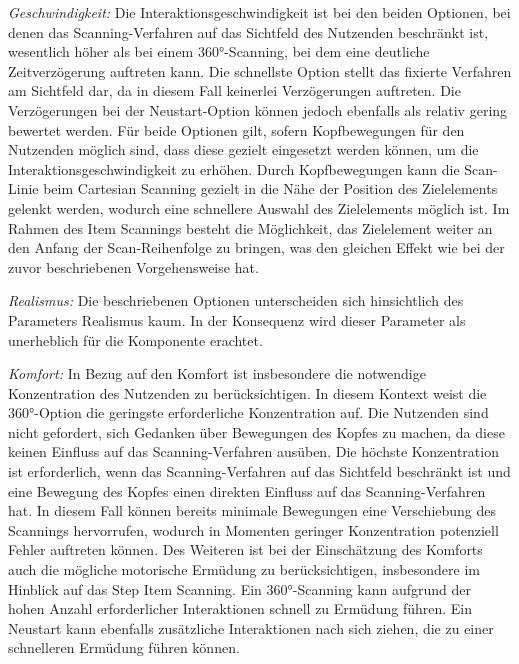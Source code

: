 \textit{Geschwindigkeit:}
Die Interaktionsgeschwindigkeit ist bei den beiden Optionen, bei denen das Scanning-Verfahren auf das Sichtfeld des Nutzenden beschränkt ist, wesentlich höher als bei einem 360°-Scanning, bei dem eine deutliche Zeitverzögerung auftreten kann.
Die schnellste Option stellt das fixierte Verfahren am Sichtfeld dar, da in diesem Fall keinerlei Verzögerungen auftreten. Die Verzögerungen bei der Neustart-Option können jedoch ebenfalls als relativ gering bewertet werden. Für beide Optionen gilt, sofern Kopfbewegungen für den Nutzenden möglich sind, dass diese gezielt eingesetzt werden können, um die Interaktionsgeschwindigkeit zu erhöhen. Durch Kopfbewegungen kann die Scan-Linie beim Cartesian Scanning gezielt in die Nähe der Position des Zielelements gelenkt werden, wodurch eine schnellere Auswahl des Zielelements möglich ist. Im Rahmen des Item Scannings besteht die Möglichkeit, das Zielelement weiter an den Anfang der Scan-Reihenfolge zu bringen, was den gleichen Effekt wie bei der zuvor beschriebenen Vorgehensweise hat.  

\textit{Realismus:}
Die beschriebenen Optionen unterscheiden sich hinsichtlich des Parameters Realismus kaum. In der Konsequenz wird dieser Parameter als unerheblich für die Komponente erachtet. 

\textit{Komfort:}
In Bezug auf den Komfort ist insbesondere die notwendige Konzentration des Nutzenden zu berücksichtigen. In diesem Kontext weist die 360°-Option die geringste erforderliche Konzentration auf. Die Nutzenden sind nicht gefordert, sich Gedanken über Bewegungen des Kopfes zu machen, da diese keinen Einfluss auf das Scanning-Verfahren ausüben. Die höchste Konzentration ist erforderlich, wenn das Scanning-Verfahren auf das Sichtfeld beschränkt ist und eine Bewegung des Kopfes einen direkten Einfluss auf das Scanning-Verfahren hat. In diesem Fall können bereits minimale Bewegungen eine Verschiebung des Scannings hervorrufen, wodurch in Momenten geringer Konzentration potenziell Fehler auftreten können. Des Weiteren ist bei der Einschätzung des Komforts auch die mögliche motorische Ermüdung zu berücksichtigen, insbesondere im Hinblick auf das Step Item Scanning. Ein 360°-Scanning kann aufgrund der hohen Anzahl erforderlicher Interaktionen schnell zu Ermüdung führen. Ein Neustart kann ebenfalls zusätzliche Interaktionen nach sich ziehen, die zu einer schnelleren Ermüdung führen können. 

